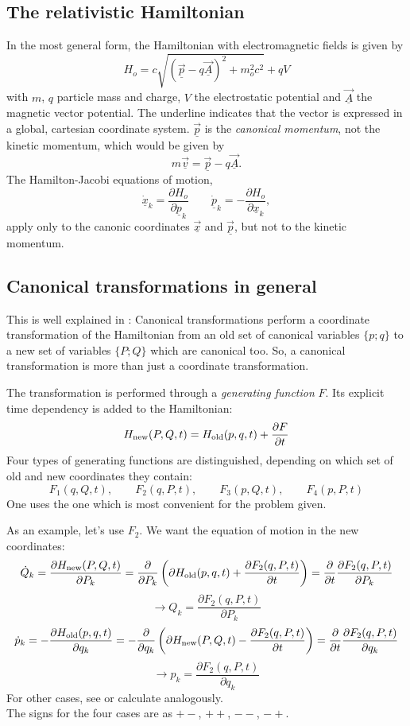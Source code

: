 \documentclass[12pt]{article}
\newcommand{\see}{\mbox{$\rightarrow$}}
\newcommand\beq{\begin{equation}}
\newcommand\eeq{\end{equation}}
\newcommand{\cvec}[1]{\mbox{$\underline{\vec{#1}}$}}
\newcommand{\csca}[1]{\mbox{$\underline{#1}$}}
\begin{document}
\subsection{The relativistic Hamiltonian}
In the most general form, the Hamiltonian with electromagnetic fields is given by
\beq\label{hamgen}
H_o = c\sqrt{(\cvec{p}-q\cvec{A})^2+m_o^2c^2}+qV
\eeq
with $m$, $q$ particle mass and charge, $V$ the electrostatic potential and \cvec{A} the
magnetic vector potential. The underline indicates that the vector is expressed in
a global, cartesian coordinate system.
\cvec{p} is the {\em canonical momentum}, not the kinetic momentum, which would be given by
\beq\label{pkin}
m\cvec{v} = \cvec{p}-q\cvec{A}.
\eeq
The Hamilton-Jacobi equations of motion,
\beq
\dot{\csca{x}}_k= \frac{\partial H_o}{\partial \csca{p}_k}\qquad
\dot{\csca{p}}_k=-\frac{\partial H_o}{\partial \csca{x}_k},
\eeq
 apply only to
the canonic coordinates \cvec{x} and \cvec{p}, but not to the kinetic momentum.

\subsection{Canonical transformations in general}
This is well explained in \cite{rees}: Canonical transformations perform
a coordinate transformation of the Hamiltonian from an old set of canonical
variables $\{p;q\}$ to a new set of variables  $\{P;Q\}$ which are canonical too.
So, a canonical transformation is more than just a coordinate transformation.

The transformation is performed through a {\em generating function} $F$. Its explicit
time dependency is added to the Hamiltonian:
\beq
H_{\rm new} (P,Q,t) = H_{\rm old}(p,q,t) + \frac{\partial F}{\partial t}
\eeq
Four types of generating functions are distinguished, depending on which set of old and new coordinates they contain:
\[ F_1 (q,Q,t),\qquad  F_2 (q,P,t),\qquad   F_3 (p,Q,t),\qquad  F_4 (p,P,t) \]
One uses the one which is most convenient for the problem given.

As an example, let's use $F_2$. We want the equation of motion in the new coordinates:
\[
\dot{Q}_k = \frac{\partial H_{\rm new}(P,Q,t)}{\partial P_k} =
 \frac{\partial}{\partial P_k} \left(\partial H_{\rm old}(p,q,t)+\frac{\partial F_2(q,P,t)}{\partial t}\right) =  \frac{\partial}{\partial t}  \frac{\partial F_2(q,P,t)}{\partial P_k}\]
\[ \see  Q_k = \frac{\partial F_2(q,P,t)}{\partial P_k}\]
\[
\dot{p}_k = - \frac{\partial H_{\rm old}(p,q,t)}{\partial q_k} =
- \frac{\partial}{\partial q_k} \left(\partial H_{\rm new}(P,Q,t)-\frac{\partial F_2(q,P,t)}{\partial t}\right) =  \frac{\partial}{\partial t}  \frac{\partial F_2(q,P,t)}{\partial q_k}\]
\[ \see  p_k = \frac{\partial F_2(q,P,t)}{\partial q_k}\]
For other cases, see \cite{rees} or calculate analogously. \\
The signs for the four cases are as $+-$, $++$, $--$, $-+$.
\end{document}
